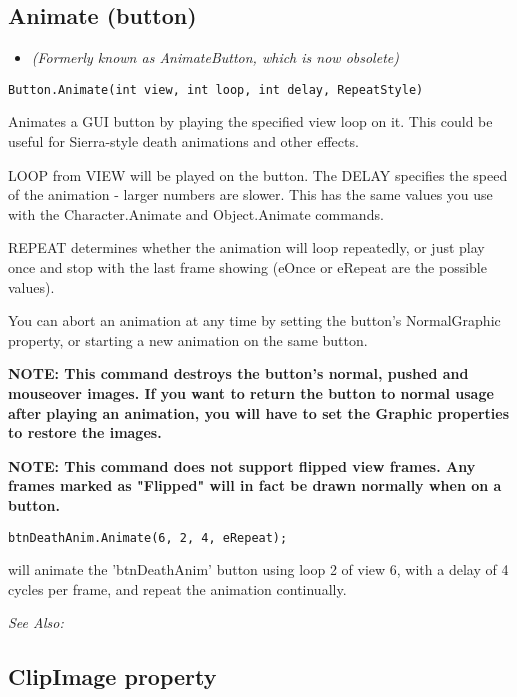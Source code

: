 \subsection{Animate (button)}\label{Button.Animate}%

\begin{itemize}
\item \it{(Formerly known as AnimateButton, which is now obsolete)}
\end{itemize}

\begin{verbatim}
Button.Animate(int view, int loop, int delay, RepeatStyle)
\end{verbatim}
Animates a GUI button by playing the specified view loop on it. This could be
useful for Sierra-style death animations and other effects.

LOOP from VIEW will be played on the button. The DELAY specifies the speed of
the animation - larger numbers are slower. This has the same values you use
with the Character.Animate and Object.Animate commands.

REPEAT determines whether the animation will loop repeatedly, or just play once and stop
with the last frame showing (eOnce or eRepeat are the possible values).

You can abort an animation at any time by setting the button's NormalGraphic property, or
starting a new animation on the same button.

\bf{NOTE:} This command destroys the button's normal, pushed and mouseover images. If you
want to return the button to normal usage after playing an animation, you will have to set
the Graphic properties to restore the images.

\bf{NOTE:} This command does not support flipped view frames. Any frames marked as "Flipped"
will in fact be drawn normally when on a button.

\begin{verbatim}
btnDeathAnim.Animate(6, 2, 4, eRepeat);
\end{verbatim}
will animate the 'btnDeathAnim' button using loop 2 of view 6, with a delay of 4
cycles per frame, and repeat the animation continually.

\it{See Also:} 


\subsection{ClipImage property}\label{Button.ClipImage}%

